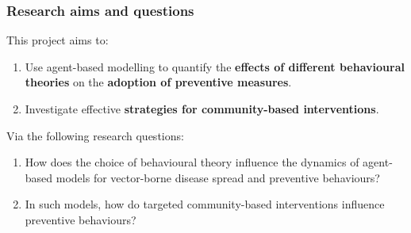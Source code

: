 \documentclass[8pt]{beamer}
\begin{document}





\begin{frame}
\frametitle{Research aims and questions}

This project aims to:

\begin{enumerate}
    \item Use agent-based modelling to quantify the \textbf{effects of different behavioural theories} on the \textbf{adoption of preventive measures}.
    \item Investigate effective \textbf{strategies for community-based interventions}.
\end{enumerate}

\vspace{1cm}
Via the following research questions:

\begin{enumerate}

\item How does the choice of \alert{behavioural theory} influence the \alert{dynamics of agent-based models} for vector-borne disease spread and preventive behaviours?\label{rq1}

\item In such models, how do targeted \alert{community-based interventions} influence \alert{preventive behaviours}?\label{rq2}

\end{enumerate}


\end{frame}
\end{document}
